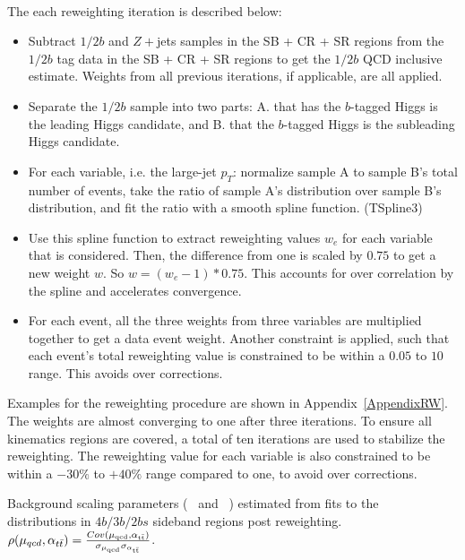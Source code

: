\paragraph{}
The each reweighting iteration is described below:
\begin{itemize}
\item Subtract $1/2b$ \ttbar and $Z+$jets samples in the SB + CR + SR regions from the $1/2b$ tag data in the SB + CR + SR regions to get the $1/2b$ QCD inclusive estimate. Weights from all previous iterations, if applicable, are all applied.
\item Separate the $1/2b$ sample into two parts: A. that has the $b$-tagged Higgs is the leading \pt Higgs candidate, and B. that the $b$-tagged Higgs is the subleading \pt Higgs candidate.
\item For each variable, i.e. the large-\R jet $p_{T}$: normalize sample A to sample B's total number of events, take the ratio of sample A's distribution over sample B's distribution, and fit the ratio with a smooth spline function. (TSpline3)
\item Use this spline function to extract reweighting values $w_{e}$ for each variable that is considered. Then, the difference from one is scaled by $0.75$ to get a new weight $w$. So $w = (w_{e} - 1) * 0.75$. This accounts for over correlation by the spline and accelerates convergence.
\item For each event, all the three weights from three variables are multiplied together to get a data event weight. Another constraint is applied, such that each event's total reweighting value is constrained to be within a $0.05$ to $10$ range. This avoids over corrections.
\end{itemize}
Examples for the reweighting procedure are shown in Appendix~\ref{AppendixRW}.
The weights are almost converging to one after three iterations.
To ensure all kinematics regions are covered, a total of ten iterations are used to stabilize the reweighting. 
The reweighting value for each variable is also constrained to be within a $-30\%$ to $+40\%$ range compared to one, to avoid over corrections.

\begin{table}[htbp!]
\begin{center}
\caption{Background scaling parameters (\muqcd~ and \alphatt~) estimated from fits to the \mleadJ~ distributions in $4b/3b/2bs$ sideband regions post reweighting. $\rho(\mu_{qcd},\alpha_{t\bar{t}}) = \frac{Cov(\rm \mu_{qcd},\rm \alpha_{\rm t\bar{t}})}{\rm \sigma_{\mu_{qcd}} \rm \sigma_{\alpha_{\rm t\bar{t}}} }$.}

\label{tab:bkgfit}
\end{center}
\end{table}

